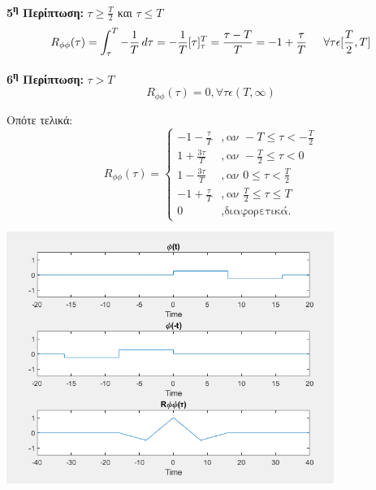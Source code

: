 \newpage

\begin{justify}
{\bf 5\textsuperscript{η} Περίπτωση:}  $\tau\geq\frac{T}{2}$ και $\tau\leq T$
\[
R_{\phi\phi}(\tau)=\int_{\tau}^{T} -\frac{1}{T}\,d\tau=
-\frac{1}{T}[\tau]_{\tau}^{T} =\frac{\tau-T}{T}
=-1+\frac{\tau}{T} \hspace{1.5em} \forall\tau\epsilon[\frac{T}{2},T]
\]
\end{justify}

\begin{justify}
{\bf 6\textsuperscript{η} Περίπτωση:}  $\tau>T$
\[
R_{\phi\phi}(\tau)=0, \forall \tau \epsilon (T,\infty)      
\]
\end{justify}

\begin{justify}
Οπότε τελικά:
\[
R_{\phi\phi}(\tau)= 
\left\{
	\begin{array}{lllll}
		-1-\frac{\tau}{T} &, \mbox{αν } -T \leq \tau < -\frac{T}{2} \\
        1+\frac{3\tau}{T} &, \mbox{αν }  -\frac{T}{2} \leq \tau <0\\
        1-\frac{3\tau}{T} &, \mbox{αν } 0 \leq \tau <\frac{T}{2}\\
        -1+\frac{\tau}{T} &, \mbox{αν } \frac{T}{2} \leq \tau \leq T\\
		0 &, \mbox{διαφορετικά.}
	\end{array}
\right.
\]
\end{justify}

\vspace{1cm}

\begin{center}
    \centering
    \includegraphics[width=0.8\textwidth]{THETA/Images/theta.fig3.png} %
    \label{fig:third_image}
\end{center}
